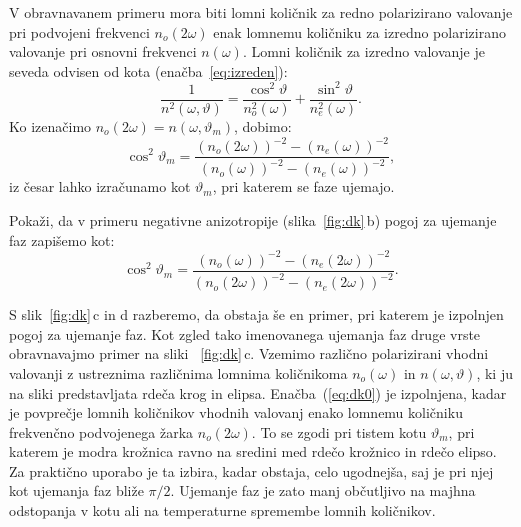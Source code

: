 V obravnavanem primeru mora biti lomni količnik za redno polarizirano valovanje pri 
podvojeni frekvenci $n_o(2\omega)$ enak lomnemu količniku za izredno 
polarizirano valovanje pri osnovni frekvenci $n(\omega)$. Lomni količnik
za izredno valovanje je seveda odvisen od kota (enačba~\ref{eq:izreden}):
\begin{equation}
\frac{1}{n^2(\omega,\vartheta)}=
\frac{\cos^{2}\vartheta}{n_{o}^2(\omega)}+\frac{\sin^{2}\vartheta}{n_{e}^2(\omega)}.
\label{8.12}
\end{equation}
Ko izenačimo $n_o(2\omega) = n(\omega,\vartheta_m)$, dobimo:
\begin{equation}
\cos^{2}\vartheta_m=\frac{(n_o(2\omega))^{-2}-(n_{e}(\omega))^{-2}}
{(n_{o}(\omega))^{-2}-(n_{e}(\omega))^{-2}},
\label{8.13}
\end{equation}
iz česar lahko izračunamo kot $\vartheta_m$, pri katerem se faze ujemajo.
\begin{naloga}
Pokaži, da v primeru negativne anizotropije (slika~\ref{fig:dk}\,b) 
pogoj za ujemanje faz zapišemo kot:
\begin{equation}
\cos^{2}\vartheta_m=\frac{(n_o(\omega))^{-2}-(n_{e}(2\omega))^{-2}}
{(n_{o}(2\omega))^{-2}-(n_{e}(2\omega))^{-2}}.
\label{8.13a}
\end{equation}
\end{naloga}

S slik~\ref{fig:dk}\,c in d razberemo, da obstaja še en primer, pri 
katerem je izpolnjen pogoj za ujemanje faz. Kot zgled tako imenovanega
ujemanja faz druge vrste obravnavajmo primer na sliki ~\ref{fig:dk}\,c.
Vzemimo različno polarizirani vhodni valovanji z ustreznima različnima lomnima
količnikoma $n_o(\omega)$ in $n(\omega,\vartheta)$, ki ju na sliki predstavljata
rdeča krog in elipsa.
Enačba~(\ref{eq:dk0}) je izpolnjena, kadar je povprečje lomnih količnikov
vhodnih valovanj  enako lomnemu količniku frekvenčno podvojenega žarka $n_o(2\omega)$. 
To se zgodi pri tistem kotu $\vartheta_m$, pri katerem je modra krožnica ravno na 
sredini med rdečo krožnico in rdečo elipso. Za praktično uporabo je ta izbira, kadar obstaja,
celo ugodnejša, saj je pri njej kot ujemanja faz bliže $\pi/2$. 
Ujemanje faz je zato manj občutljivo na majhna odstopanja v kotu ali na temperaturne
spremembe lomnih količnikov. 

